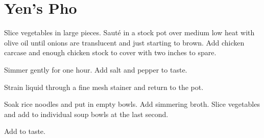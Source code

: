 \section{Yen's Pho}
\begin{recipe}


Slice vegetables in large pieces. Sauté in a stock pot over medium low heat with olive oil until onions are translucent and just starting to brown. Add chicken carcase and enough chicken stock to cover with two inches to spare.

Simmer gently for one hour. Add salt and pepper to taste.

Strain liquid through a fine mesh stainer and return to the pot.


Soak rice noodles and put in empty bowls. Add simmering broth. Slice vegetables and add to individual soup bowls at the last second.


Add to taste.


\end{recipe}

